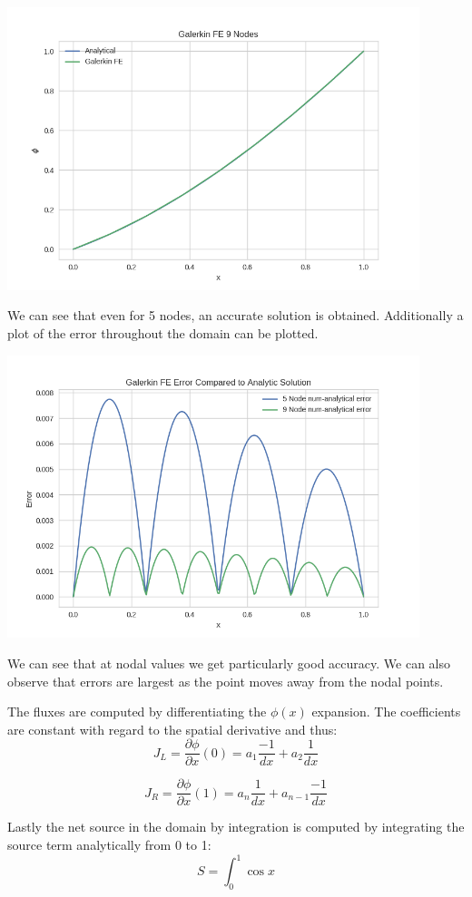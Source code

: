 \documentclass[11pt]{article}
\begin{document}
\includegraphics[width=12cm]{./figures/9nodes.png}

We can see that even for 5 nodes, an accurate solution is obtained.
Additionally a plot of the error throughout the domain can be plotted.

\includegraphics[width=12cm]{./figures/error.png}

We can see that at nodal values we get particularly good accuracy. We can also observe that errors are largest as the point moves away from the nodal points.

The fluxes are computed by differentiating the $\phi (x)$ expansion. The coefficients are constant with regard to the spatial derivative and thus:
\[
J_{L} = \frac{\partial \phi}{\partial x} (0) = a_{1} \frac{-1}{dx} + a_{2} \frac{1}{dx}  
\]

\[
J_{R} = \frac{\partial \phi}{\partial x} (1) = a_{n} \frac{1}{dx} + a_{n-1} \frac{-1}{dx} 
\]

Lastly the net source in the domain by integration is computed by integrating the source term analytically from 0 to 1:
\[
S = \int_{0}^{1} \cos x
\] 
\end{document}
